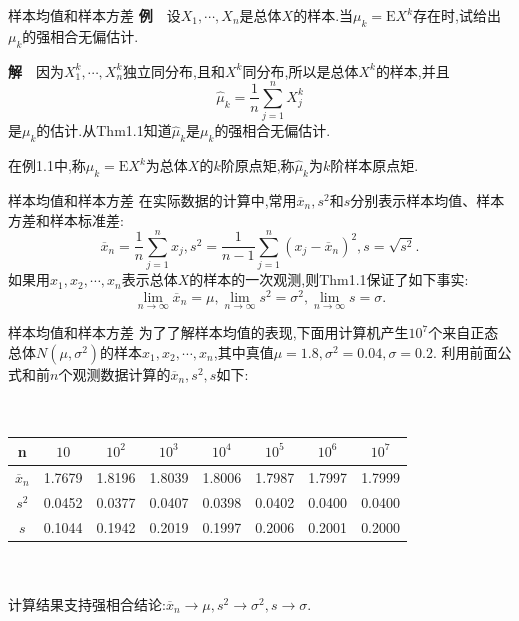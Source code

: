	\begin{frame}{样本均值和样本方差}
		\textbf{例}$\quad$设$X_1,\cdots,X_n$是总体$X$的样本.当$\mu_k = \mathrm{E}X^k$存在时,试给出$\mu_k$的强相合无偏估计.
	
		\textbf{解}$\quad$因为$X_1^k,\cdots,X_n^k$独立同分布,且和$X^k$同分布,所以是总体$X^k$的样本,并且
		\begin{equation}
			\widehat{\mu}_k = \frac{1}{n}\sum_{j=1}^nX_j^k
		\end{equation}
		是$\mu_k$的估计.从Thm1.1知道$\widehat{\mu}_k$是$\mu_k$的强相合无偏估计.
		
		在例1.1中,称$\mu_k = \mathrm{E}X^k$为总体$X$的$k$阶原点矩,称$\widehat{\mu}_k$为$k$阶样本原点矩.
	\end{frame}
	
	\begin{frame}{样本均值和样本方差}
		在实际数据的计算中,常用$\overline{x}_n,s^2$和$s$分别表示样本均值、样本方差和样本标准差:
		\begin{equation}
			\overline{x}_n = \frac{1}{n}\sum_{j=1}^nx_j,s^2 = \frac{1}{n-1}\sum_{j=1}^n(x_j-\overline{x}_n)^2,s = \sqrt{s^2}.
		\end{equation}
		如果用$x_1,x_2,\cdots,x_n$表示总体$X$的样本的一次观测,则Thm1.1保证了如下事实:
		\begin{equation}
			\lim\limits_{n\to\infty} \overline{x}_n = \mu,	\lim\limits_{n\to\infty}s^2 = \sigma^2,	\lim\limits_{n\to\infty} s = \sigma.
		\end{equation}
	\end{frame}


	\begin{frame}{样本均值和样本方差}
		为了了解样本均值的表现,下面用计算机产生$10^7$个来自正态总体$N(\mu,\sigma^2)$的样本$x_1,x_2,\cdots,x_n$,其中真值$\mu = 1.8,\sigma^2 = 0.04,\sigma = 0.2$.
		利用前面公式和前$n$个观测数据计算的$\overline{x}_n,s^2,s$如下:
				\\ \hspace*{\fill} \\%
		$\quad$\begin{tabular}{|c|c|c|c|c|c|c|c|}
			\hline n & $10$ & $10^2$ & $10^3$ & $10^4$ & $10^5$ & $10^6$ & $10^7$ \\
			\hline $\overline{x}_n$ & 1.7679 & 1.8196 & 1.8039 & 1.8006 & 1.7987 & 1.7997 & 1.7999\\
			\hline $s^2$ & 0.0452 & 0.0377 & 0.0407 & 0.0398 & 0.0402 & 0.0400 & 0.0400\\
			\hline $s$ & 0.1044 & 0.1942 & 0.2019 & 0.1997 & 0.2006 & 0.2001 & 0.2000\\
			\hline
		\end{tabular}
			\\ \hspace*{\fill} \\%
		计算结果支持强相合结论:$\overline{x}_n\to\mu,s^2\to\sigma^2,s\to\sigma$.
	\end{frame}

